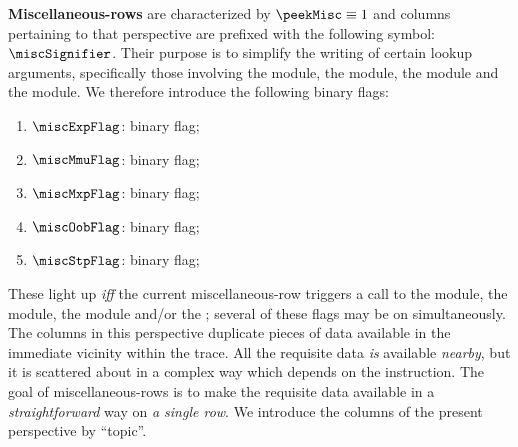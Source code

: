 \textbf{Miscellaneous-rows} are characterized by $\peekMisc \equiv 1$ and columns pertaining to that perspective are prefixed with the following symbol: $\miscSignifier$. 
Their purpose is to simplify the writing of certain lookup arguments, specifically those involving
the \mmuMod{} module,
the \stpMod{} module,
the \oobMod{} module and
the \mxpMod{} module.
We therefore introduce the following binary flags:
\begin{enumerate}
	\item $\miscExpFlag$:
		binary flag; 
	\item $\miscMmuFlag$:
		binary flag; 
	\item $\miscMxpFlag$:
		binary flag; 
	\item $\miscOobFlag$:
		binary flag; 
	\item $\miscStpFlag$:
		binary flag; 
\end{enumerate}
These light up \emph{iff} the current miscellaneous-row triggers a call to
the \stpMod{} module,
the \mxpMod{} module,
the \oobMod{} module and/or
the \mmuMod{}; several of these flags may be on simultaneously. 
The columns in this perspective duplicate pieces of data available in the immediate vicinity within the trace.
All the requisite data \emph{is} available \emph{nearby}, but it is scattered about in a complex way which depends on the instruction. 
The goal of miscellaneous-rows is to make the requisite data available in a \emph{straightforward} way on \emph{a single row}. We introduce the columns of the present perspective by ``topic''.
